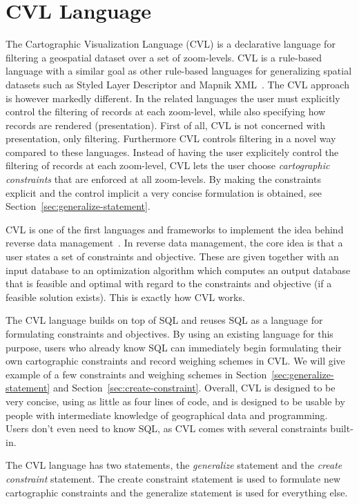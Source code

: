 \section{CVL Language}
\label{sec:cvl-language}
The Cartographic Visualization Language (CVL) is a declarative language for filtering a geospatial dataset over a set of zoom-levels. CVL is a rule-based language with a similar goal as other rule-based languages for generalizing spatial datasets such as Styled Layer Descriptor and Mapnik XML~\cite{sld,mapnik}. The CVL approach is however markedly different. In the related languages the user must explicitly control the filtering of records at each zoom-level, while also specifying how records are rendered (presentation). First of all, CVL is not concerned with presentation, only filtering. Furthermore CVL controls filtering in a novel way compared to these languages. Instead of having the user explicitely control the filtering of records at each zoom-level, CVL lets the user choose \emph{cartographic constraints} that are enforced at all zoom-levels. By making the constraints explicit and the control implicit a very concise formulation is obtained, see Section~\ref{sec:generalize-statement}.

CVL is one of the first languages and frameworks to implement the idea behind reverse data management~\cite{reverse}. In reverse data management, the core idea is that a user states a set of constraints and objective. These are given together with an input database to an optimization algorithm which computes an output database that is feasible and optimal with regard to the constraints and objective (if a feasible solution exists). This is exactly how CVL works. 

The CVL language builds on top of SQL and reuses SQL as a language for formulating constraints and objectives. By using an existing language for this purpose, users who already know SQL can immediately begin formulating their own cartographic constraints and record weighing schemes in CVL. We will give example of a few constraints and weighing schemes in Section~\ref{sec:generalize-statement} and Section~\ref{sec:create-constraint}. Overall, CVL is designed to be very concise, using as little as four lines of code, and is designed to be usable by people with intermediate knowledge of geographical data and programming. Users don't even need to know SQL, as CVL comes with several constraints built-in.

The CVL language has two statements, the \emph{generalize} statement and the \emph{create constraint} statement. The create constraint statement is used to formulate new cartographic constraints and the generalize statement is used for everything else. 

